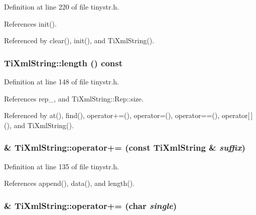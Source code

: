 Definition at line 220 of file tinystr.h.

References init().

Referenced by clear(), init(), and TiXmlString().\hypertarget{class_ti_xml_string_a3202f27d139a3fac79205f1f3c707727}{
\subsubsection[{length}]{ TiXmlString::length () const}}
\label{class_ti_xml_string_a3202f27d139a3fac79205f1f3c707727}


Definition at line 148 of file tinystr.h.

References rep\_\-, and TiXmlString::Rep::size.

Referenced by at(), find(), operator+=(), operator=(), operator==(), operator\mbox{[}$\,$\mbox{]}(), and TiXmlString().\hypertarget{class_ti_xml_string_afdcae5ea2b4d9e194dc21226b817f417}{
\subsubsection[{operator+=}]{\& TiXmlString::operator+= (const {\bf TiXmlString} \& {\em suffix})}}
\label{class_ti_xml_string_afdcae5ea2b4d9e194dc21226b817f417}


Definition at line 135 of file tinystr.h.

References append(), data(), and length().\hypertarget{class_ti_xml_string_a6aa09d5240470b76d54ec709e04f8c13}{
\subsubsection[{operator+=}]{\& TiXmlString::operator+= (char {\em single})}}
\label{class_ti_xml_string_a6aa09d5240470b76d54ec709e04f8c13}



